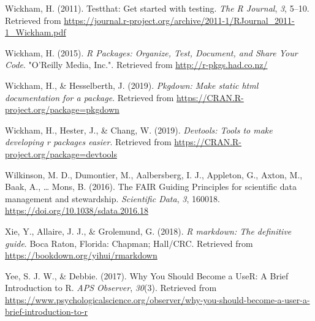 \documentclass[
  english,
  jou,floatsintext]{apa6}
\newlength{\cslhangindent}
\newenvironment{cslreferences}%
  {\setlength{\parindent}{0pt}%
  \everypar{\setlength{\hangindent}{\cslhangindent}}\ignorespaces}%
  {\par}
\begin{document}
\begin{cslreferences}
\leavevmode\hypertarget{ref-R-testthat}{}%
Wickham, H. (2011). Testthat: Get started with testing. \emph{The R Journal}, \emph{3}, 5--10. Retrieved from \url{https://journal.r-project.org/archive/2011-1/RJournal_2011-1_Wickham.pdf}

\leavevmode\hypertarget{ref-WickhamPackagesOrganizeTest2015}{}%
Wickham, H. (2015). \emph{R Packages: Organize, Test, Document, and Share Your Code}. "O'Reilly Media, Inc.". Retrieved from \url{http://r-pkgs.had.co.nz/}

\leavevmode\hypertarget{ref-R-pkgdown}{}%
Wickham, H., \& Hesselberth, J. (2019). \emph{Pkgdown: Make static html documentation for a package}. Retrieved from \url{https://CRAN.R-project.org/package=pkgdown}

\leavevmode\hypertarget{ref-R-devtools}{}%
Wickham, H., Hester, J., \& Chang, W. (2019). \emph{Devtools: Tools to make developing r packages easier}. Retrieved from \url{https://CRAN.R-project.org/package=devtools}

\leavevmode\hypertarget{ref-WilkinsonFAIRGuidingPrinciples2016}{}%
Wilkinson, M. D., Dumontier, M., Aalbersberg, I. J., Appleton, G., Axton, M., Baak, A., \ldots{} Mons, B. (2016). The FAIR Guiding Principles for scientific data management and stewardship. \emph{Scientific Data}, \emph{3}, 160018. \url{https://doi.org/10.1038/sdata.2016.18}

\leavevmode\hypertarget{ref-R-rmarkdown}{}%
Xie, Y., Allaire, J. J., \& Grolemund, G. (2018). \emph{R markdown: The definitive guide}. Boca Raton, Florida: Chapman; Hall/CRC. Retrieved from \url{https://bookdown.org/yihui/rmarkdown}

\leavevmode\hypertarget{ref-yee_why_2017}{}%
Yee, S. J. W., \& Debbie. (2017). Why You Should Become a UseR: A Brief Introduction to R. \emph{APS Observer}, \emph{30}(3). Retrieved from \url{https://www.psychologicalscience.org/observer/why-you-should-become-a-user-a-brief-introduction-to-r}
\end{cslreferences}

\endgroup
\end{document}
